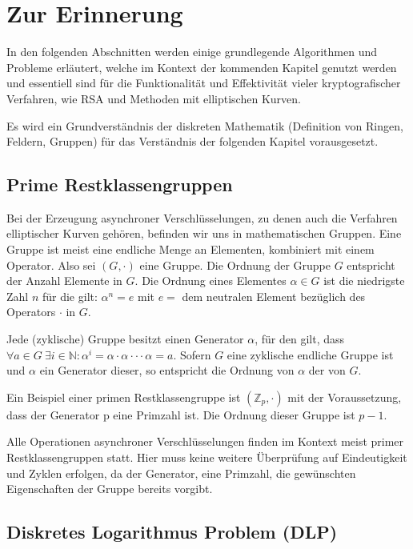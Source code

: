 \chapter{Zur Erinnerung}

In den folgenden Abschnitten werden einige grundlegende Algorithmen und Probleme erläutert, welche im Kontext der kommenden 
Kapitel genutzt werden und essentiell sind für die Funktionalität und Effektivität vieler kryptografischer Verfahren, wie RSA und Methoden mit elliptischen Kurven.

Es wird ein Grundverständnis der diskreten Mathematik (Definition von Ringen, Feldern, Gruppen) für das Verständnis der folgenden Kapitel vorausgesetzt.

\section{Prime Restklassengruppen}

Bei der Erzeugung asynchroner Verschlüsselungen, zu denen auch die Verfahren elliptischer Kurven gehören, befinden wir uns in mathematischen Gruppen.
Eine Gruppe ist meist eine endliche Menge an Elementen, kombiniert mit einem Operator. Also sei $(G,\cdotp)$ eine Gruppe.
Die Ordnung der Gruppe $G$ entspricht der Anzahl Elemente in $G$. Die Ordnung eines Elementes $\alpha \in G$ ist 
die niedrigste Zahl $n$ für die gilt: $\alpha^n = e$ mit $e =$ dem neutralen Element bezüglich des Operators $\cdotp$ in $G$.

Jede (zyklische) Gruppe besitzt einen Generator $\alpha$, für den gilt, dass $\forall a \in G \ \exists i \in  \mathbb{N}: \alpha^i = \alpha \cdotp \alpha \cdotp \cdotp \cdotp \alpha = a $. Sofern $G$ eine zyklische endliche Gruppe ist und $\alpha$ ein Generator dieser, so entspricht die Ordnung von $\alpha$ der von $G$.

Ein Beispiel einer primen Restklassengruppe ist $(\mathbb{Z}_p,\cdotp)$ mit der Voraussetzung, dass der Generator p eine Primzahl ist. Die Ordnung dieser Gruppe ist $p-1$.

Alle Operationen asynchroner Verschlüsselungen finden im Kontext meist primer Restklassengruppen statt. Hier 
muss keine weitere Überprüfung auf Eindeutigkeit und Zyklen erfolgen, da der Generator, eine Primzahl, die gewünschten
Eigenschaften der Gruppe bereits vorgibt.

\section{Diskretes Logarithmus Problem (DLP)} \label{DLP}

